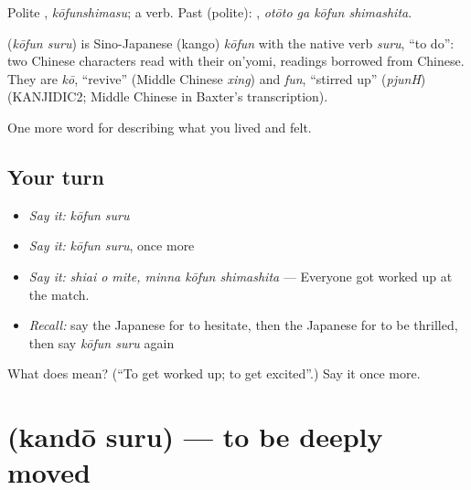 Polite \textbf{}, \emph{kōfunshimasu}; a  verb. Past (polite): \textbf{ }, \emph{otōto ga kōfun shimashita}.

\begin{cousinweb}
\textbf{} (\emph{kōfun suru}) is Sino-Japanese (kango) \emph{kōfun} with the native verb \emph{suru}, \textquotedblleft{}to do\textquotedblright{}: two Chinese characters read with their on'yomi, readings borrowed from Chinese. They are \emph{kō}, \textquotedblleft{}revive\textquotedblright{} (Middle Chinese \emph{xing}) and \emph{fun}, \textquotedblleft{}stirred up\textquotedblright{} (\emph{pjunH}) (KANJIDIC2; Middle Chinese in Baxter's transcription).
\end{cousinweb}

\begin{grammarlens}[title={What you've built}]
One more word for describing what you lived and felt.
\end{grammarlens}

\subsection*{Your turn}
\begin{itemize}
\raggedright
  \item \emph{Say it:} \emph{kōfun suru}
  \item \emph{Say it:} \emph{kōfun suru}, once more
  \item \emph{Say it:} \emph{shiai o mite, minna kōfun shimashita} — Everyone got worked up at the match.
  \item \emph{Recall:} say the Japanese for to hesitate, then the Japanese for to be thrilled, then say \emph{kōfun suru} again
\end{itemize}

\begin{tcolorbox}[breakable,colback=teal!4,colframe=teal!35!black,title={Before you move on}]
What does  mean? (\textquotedblleft{}To get worked up; to get excited\textquotedblright{}.) Say it once more.
\end{tcolorbox}
\section[\texorpdfstring{\ja{かんどうする} (kandō suru)}{かんどうする (kandō suru)}]{ (kandō suru) — to be deeply moved}

\label{lesson:JA-C428-kandou-suru}



